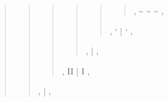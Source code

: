 \documentclass[letterpaper,10pt,english]{sphinxmanual}
\begin{document}
\begin{fulllineitems}
\begin{fulllineitems}
\begin{quote}
\begin{quote}
\begin{quote}
\begin{quote}
\begin{quote}
\begin{quote}
\sphinxAtStartPar
, \sphinxhyphen{} \textasciitilde{} \textasciitilde{} \textasciitilde{} \sphinxhyphen{} ,
\end{quote}

\sphinxAtStartPar
, ‘       |        ‘ ,
\end{quote}

\sphinxAtStartPar
,           |            ,
\end{quote}

\sphinxAtStartPar
,     II     |    I        ,
\end{quote}

\sphinxAtStartPar
,             |             ,
\end{quote}
\begin{description}
\begin{description}
\sphinxlineitem{,             |             ,}\begin{description}
\begin{description}
\sphinxlineitem{,           |           ,}\begin{description}
\begin{description}

\end{description}

\end{description}

\end{description}

\end{description}

\end{description}

\end{description}
\end{quote}

\end{fulllineitems}



\end{fulllineitems}
\end{document}
